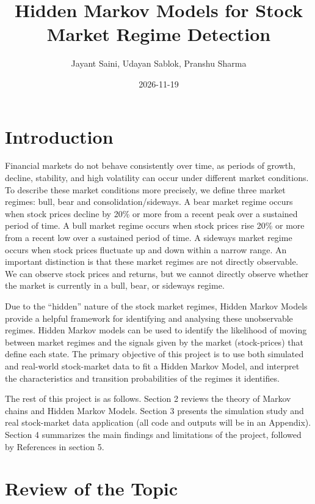\documentclass[
]{article}
\title{Hidden Markov Models for Stock Market Regime Detection}
\author{Jayant Saini, Udayan Sablok, Pranshu Sharma}
\date{2026-11-19}
\begin{document}
\maketitle

\newpage 
\tableofcontents 
\newpage

\newpage

\section{Introduction}\label{introduction}

Financial markets do not behave consistently over time, as periods of
growth, decline, stability, and high volatility can occur under
different market conditions. To describe these market conditions more
precisely, we define three market regimes: bull, bear and
consolidation/sideways. A bear market regime occurs when stock prices
decline by 20\% or more from a recent peak over a sustained period of
time. A bull market regime occurs when stock prices rise 20\% or more
from a recent low over a sustained period of time. A sideways market
regime occurs when stock prices fluctuate up and down within a narrow
range. An important distinction is that these market regimes are not
directly observable. We can observe stock prices and returns, but we
cannot directly observe whether the market is currently in a bull, bear,
or sideways regime.

Due to the ``hidden'' nature of the stock market regimes, Hidden Markov
Models provide a helpful framework for identifying and analysing these
unobservable regimes. Hidden Markov models can be used to identify the
likelihood of moving between market regimes and the signals given by the
market (stock-prices) that define each state. The primary objective of
this project is to use both simulated and real-world stock-market data
to fit a Hidden Markov Model, and interpret the characteristics and
transition probabilities of the regimes it identifies.

The rest of this project is as follows. Section 2 reviews the theory of
Markov chains and Hidden Markov Models. Section 3 presents the
simulation study and real stock-market data application (all code and
outputs will be in an Appendix). Section 4 summarizes the main findings
and limitations of the project, followed by References in section 5.

\section{Review of the Topic}\label{review-of-the-topic}
\end{document}
